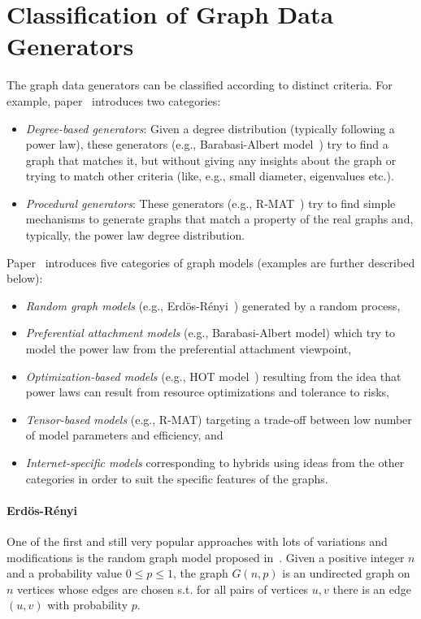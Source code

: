 \section{Classification of Graph Data Generators}
\label{sec:classification}

The graph data generators can be classified according to distinct criteria. For example, paper~\cite{DBLP:conf/sdm/ChakrabartiZF04} introduces two categories:

\begin{itemize}
  \item \emph{Degree-based generators}: Given a degree distribution (typically following a power law), these generators (e.g., Barabasi-Albert model~\cite{Barabasi99emergenceScaling}) try to find a graph that matches it, but without giving any insights about the graph or trying to match other criteria (like, e.g., small diameter, eigenvalues etc.).
  \item \emph{Procedural generators}: These generators (e.g., R-MAT~\cite{DBLP:conf/sdm/ChakrabartiZF04}) try to find simple mechanisms to generate graphs that match a property of the real graphs and, typically, the power law degree distribution.
\end{itemize}

Paper~\cite{Chakrabarti:2006:GML:1132952.1132954} introduces five categories of graph models (examples are further described below):
\begin{itemize}
  \item \emph{Random graph models} (e.g., Erd\"{o}s-R\'{e}nyi~\cite{Erdos:1960}) generated by a random process,
  \item \emph{Preferential attachment models} (e.g., Barabasi-Albert model) which try to model the power law from the preferential attachment viewpoint,
  \item \emph{Optimization-based models} (e.g., HOT model~\cite{PhysRevLett.84.2529}) resulting from the idea that power laws can result from resource optimizations and tolerance to risks,
  \item \emph{Tensor-based models} (e.g., R-MAT) targeting a trade-off between low number of model parameters and efficiency, and
  \item \emph{Internet-specific models} corresponding to hybrids using ideas from the other categories in order to suit the specific features of the graphs.
\end{itemize}

\paragraph{Erd\"{o}s-R\'{e}nyi} One of the first and still very popular approaches with lots of variations and modifications is the random graph model proposed in~\cite{Erdos:1960}. Given a positive integer $n$ and a probability value $0 \leq p \leq 1$, the graph $G(n,p)$ is an undirected graph on $n$ vertices whose edges are chosen s.t. for all pairs of vertices $u,v$ there is an edge $(u,v)$ with probability $p$.

